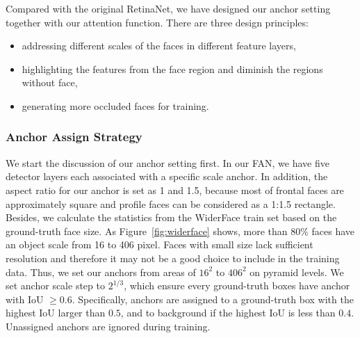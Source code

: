 \documentclass[10pt,twocolumn,letterpaper]{article}
\begin{document}
Compared with the original RetinaNet, we have designed our anchor setting together with our attention function. There are three design principles:
\begin{itemize}
\item addressing different scales of the faces in different feature layers, 
\item highlighting the features from the face region and diminish the regions without face,
\item generating more occluded faces for training. 
\end{itemize}


\subsubsection{Anchor Assign Strategy\label{sec:anchor matching}}


We start the discussion of our anchor setting first. In our FAN, we have five detector layers each associated with a specific scale anchor. In addition, the aspect ratio for our anchor is set as 1 and 1.5, because most of frontal faces are approximately square and profile faces can be considered as a 1:1.5 rectangle. Besides, we calculate the statistics from the WiderFace train set based on the ground-truth face size. As Figure~\ref{fig:widerface} shows, more than 80\% faces have an object scale from 16 to 406 pixel. Faces with small size lack sufficient resolution and therefore it may not be a good choice to include in the training data. Thus, we set our anchors from areas of $ 16^2 $ to $ 406^2 $ on pyramid levels. We set anchor scale step to $ 2 ^ {1/3} $, which ensure every ground-truth boxes have anchor with IoU $ \geq 0.6 $. Specifically, anchors are assigned to a ground-truth box with the highest IoU larger than $0.5$, and to background if the highest IoU is less than $0.4$. Unassigned anchors are ignored during training.
\end{document}
